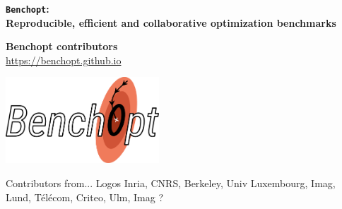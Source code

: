 \documentclass[unknownkeysallowed]{beamer}
\begin{document}


\begin{frame}
\bigskip
\bigskip
\begin{center}{
\LARGE\color{marron}
\textbf{\texttt{Benchopt}:\\
Reproducible, efficient and collaborative optimization benchmarks}
\textbf{ }\\
}

\color{marron}
\end{center}

\vspace{0.5cm}

\begin{center}
\textbf{Benchopt contributors} \\
\vspace{0.1cm}
\url{https://benchopt.github.io}\\
\end{center}

\centering
\includegraphics[width=0.43\textwidth]{../sharedimages/benchopt_logo.pdf}

\end{frame}

\begin{frame}{Contributors from...}
Logos Inria, CNRS, Berkeley, Univ Luxembourg, Imag, Lund, Télécom, Criteo, Ulm, Imag ?
\end{frame}
\end{document}
